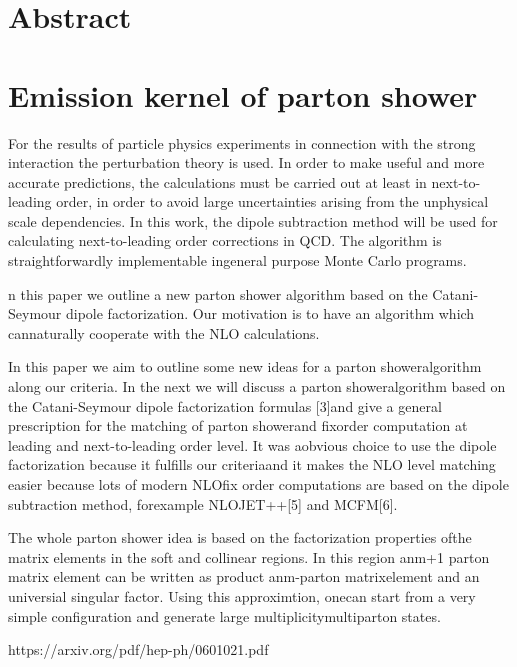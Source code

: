 \section*{\Large \bfseries Abstract}
\vspace{3cm}
\section*{Emission kernel of parton shower}
For the results of particle physics experiments in connection with the strong interaction 
the perturbation theory is used. In order to make useful and more accurate predictions, the calculations must be carried out at least in next-to-leading order, in order to avoid large uncertainties arising from the unphysical scale dependencies.
In this work, the dipole subtraction method will be used for calculating next-to-leading order corrections in QCD.
The algorithm is straightforwardly implementable ingeneral purpose Monte Carlo programs.

n this paper we outline a new parton shower algorithm based on the Catani-Seymour dipole factorization. Our motivation is to have an algorithm which cannaturally cooperate with the NLO calculations.

In this paper we aim to outline some new ideas for a parton showeralgorithm along our criteria. In the next we will discuss a parton showeralgorithm based on the Catani-Seymour dipole factorization formulas [3]and give a general prescription for the matching of parton showerand fixorder computation at leading and next-to-leading order level.  It was aobvious choice to use the dipole factorization because it fulfills our criteriaand it makes the NLO level matching easier because lots of modern NLOfix order computations are based on the dipole subtraction method, forexample NLOJET++[5] and MCFM[6].

The whole parton shower idea is based on the factorization properties ofthe matrix elements in the soft and collinear regions.  In this region anm+1 parton matrix element can be written as product anm-parton matrixelement and an universial singular factor.  Using this approximtion, onecan start from a very simple configuration and generate large multiplicitymultiparton states.

https://arxiv.org/pdf/hep-ph/0601021.pdf


